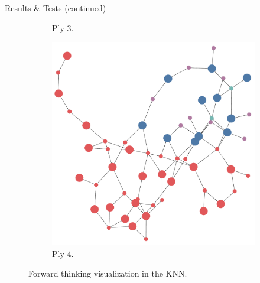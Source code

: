 \documentclass[final]{beamer} %
\begin{document}
\begin{frame}
\begin{columns}
\begin{column}{.3\textwidth}
{\begin{block}{Results \& Tests (continued)}
\begin{figure}[!htb]
\begin{subfigure}[!htb]{0.24\columnwidth}
							\caption{Ply 3.}
						\end{subfigure}
						\begin{subfigure}[!htb]{0.24\columnwidth}
							\centering
							\includegraphics[width=\columnwidth]{figures/knn_forward_think_4.pdf}
							\caption{Ply 4.}
						\end{subfigure}
						\caption{Forward thinking visualization in the KNN.}
					\end{figure}
					

\end{block}}
\end{column}
\end{columns}
\end{frame}
\end{document}

